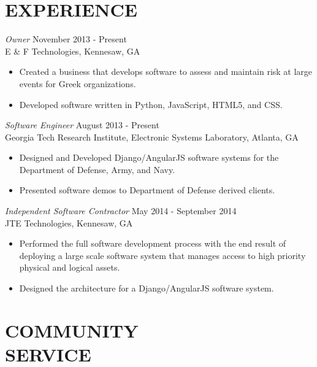 \documentclass[margin, 10pt]{res} %
\begin{document}
\begin{resume}
 
\section{EXPERIENCE}

{\sl Owner} \hfill November 2013 - Present \\
E \& F Technologies, Kennesaw, GA
\begin{itemize}
\item Created a business that develops software to assess and maintain risk at large events for Greek organizations.
\item Developed software written in Python, JavaScript, HTML5, and CSS.
\end{itemize} 

{\sl Software Engineer} \hfill August 2013 - Present \\
Georgia Tech Research Institute, Electronic Systems Laboratory, Atlanta, GA 
\begin{itemize} \itemsep -2pt %
\item Designed and Developed Django/AngularJS software systems for the Department of Defense, Army, and Navy.
\item Presented software demos to Department of Defense derived clients.
\end{itemize}
 
{\sl Independent Software Contractor} \hfill May 2014 - September 2014\\
JTE Technologies, Kennesaw, GA
\begin{itemize} 
\item Performed the full software development process with the end result of deploying a large scale software system that manages access to high priority physical and logical assets.
\item Designed the architecture for a Django/AngularJS software system.
\end{itemize} 



\section{COMMUNITY \\ SERVICE}


\end{resume}
\end{document}
